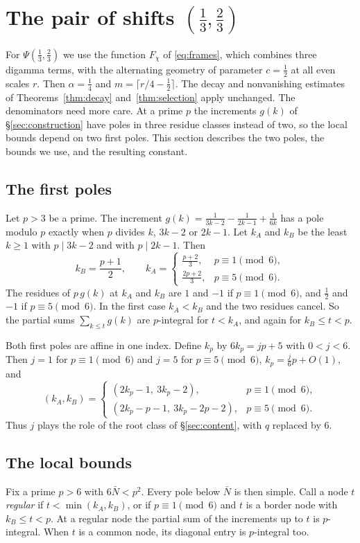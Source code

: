 \documentclass[11pt]{amsart}
\theoremstyle{definition}
\theoremstyle{remark}
\numberwithin{equation}{section}
\begin{document}
\section{The pair of shifts \texorpdfstring{$(\frac13,\frac23)$}{(1/3,2/3)}}
\label{sec:chi3-quarter}

For $\Psi(\frac13,\frac23)$ we use the function $F_\chi$ of \eqref{eq:frames}, which combines three digamma terms, with
the alternating geometry of parameter $c=\frac12$ at all even scales $r$. Then $\alpha=\frac14$ and
$m=\lceil r/4-\frac12\rceil$. The decay and nonvanishing estimates of Theorems~\ref{thm:decay} and~\ref{thm:selection}
apply unchanged. The denominators need more care. At a prime $p$ the increments $g(k)$ of \S\ref{sec:construction} have
poles in three residue classes instead of two, so the local bounds depend on two first poles. This section describes the
two poles, the bounds we use, and the resulting constant.

\subsection{The first poles}
Let $p>3$ be a prime. The increment $g(k)=\frac1{3k-2}-\frac1{2k-1}+\frac1{6k}$ has a pole modulo $p$ exactly when $p$
divides $k$, $3k-2$ or $2k-1$. Let $k_A$ and $k_B$ be the least $k\ge1$ with $p\mid3k-2$ and with $p\mid2k-1$. Then
\[
 k_B=\frac{p+1}2,\qquad
 k_A=\begin{cases}\frac{p+2}3,&p\equiv1\pmod6,\\[3pt]\frac{2p+2}3,&p\equiv5\pmod6.\end{cases}
\]
The residues of $p\,g(k)$ at $k_A$ and $k_B$ are $1$ and $-1$ if $p\equiv1\pmod6$, and $\frac12$ and $-1$ if
$p\equiv5\pmod6$. In the first case $k_A<k_B$ and the two residues cancel. So the partial sums $\sum_{k\le t}g(k)$ are
$p$-integral for $t<k_A$, and again for $k_B\le t<p$.

Both first poles are affine in one index. Define $k_p$ by $6k_p=jp+5$ with $0<j<6$. Then $j=1$ for $p\equiv1\pmod6$ and
$j=5$ for $p\equiv5\pmod6$, $k_p=\frac j6p+O(1)$, and
\[
 (k_A,k_B)=\begin{cases}(2k_p-1,\ 3k_p-2),&p\equiv1\pmod6,\\[2pt](2k_p-p-1,\ 3k_p-2p-2),&p\equiv5\pmod6.\end{cases}
\]
Thus $j$ plays the role of the root class of \S\ref{sec:content}, with $q$ replaced by $6$.

\subsection{The local bounds}
Fix a prime $p>6$ with $6\bar N<p^2$. Every pole below $\bar N$ is then simple. Call a node $t$ \emph{regular} if
$t<\min(k_A,k_B)$, or if $p\equiv1\pmod6$ and $t$ is a border node with $k_B\le t<p$. At a regular node the partial sum
of the increments up to $t$ is $p$-integral. When $t$ is a common node, its diagonal entry is $p$-integral too.
\end{document}
